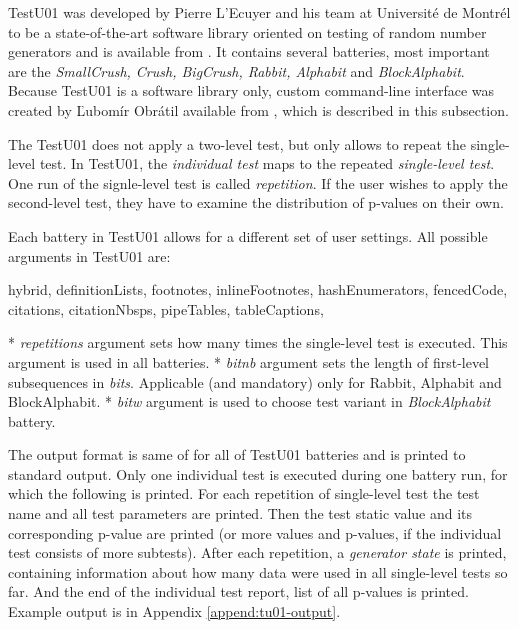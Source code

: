 \documentclass[
  digital,     %
  oneside,     %
  nosansbold,  %
  nocolorbold, %
  nolof,         %
  nolot,         %
]{fithesis4}
\begin{document}
TestU01 was developed by Pierre L'Ecuyer and his team at Université de Montrél to be a state-of-the-art software library oriented on testing of random number generators \cite{tu01_paper} and is available from \cite{tu01_site}. It contains several batteries, most important are the \emph{SmallCrush, Crush, BigCrush, Rabbit, Alphabit} and \emph{BlockAlphabit}. Because TestU01 is a software library only, custom command-line interface was created by Ľubomír Obrátil available from \cite{rtt-batteries}, which is described in this subsection.

The TestU01 does not apply a two-level test, but only allows to repeat the single-level test. In TestU01, the \emph{individual test} maps to the repeated \emph{single-level test}. One run of the signle-level test is called \emph{repetition}. If the user wishes to apply the second-level test, they have to examine the distribution of p-values on their own.

Each battery in TestU01 allows for a different set of user settings. All possible arguments in TestU01 are:
\begin{markdown*}{%
  hybrid,
  definitionLists,
  footnotes,
  inlineFootnotes,
  hashEnumerators,
  fencedCode,
  citations,
  citationNbsps,
  pipeTables,
  tableCaptions,
}

* \emph{repetitions} argument sets how many times the single-level test is executed. This argument is used in all batteries.
* \emph{bit\textunderscore nb} argument sets the length of first-level subsequences in \emph{bits}. Applicable (and mandatory) only for Rabbit, Alphabit and BlockAlphabit.
* \emph{bit\textunderscore w} argument is used to choose test variant in \emph{BlockAlphabit} battery.
\end{markdown*}

The output format is same of for all of TestU01 batteries and is printed to standard output. Only one individual test is executed during one battery run, for which the following is printed. For each repetition of single-level test the test name and all test parameters are printed. Then the test static value and its corresponding p-value are printed (or more values and p-values, if the individual test consists of more subtests). After each repetition, a \emph{generator state} is printed, containing information about how many data were used in all single-level tests so far. And the end of the individual test report, list of all p-values is printed. Example output is in Appendix \ref{append:tu01-output}.
\end{document}
